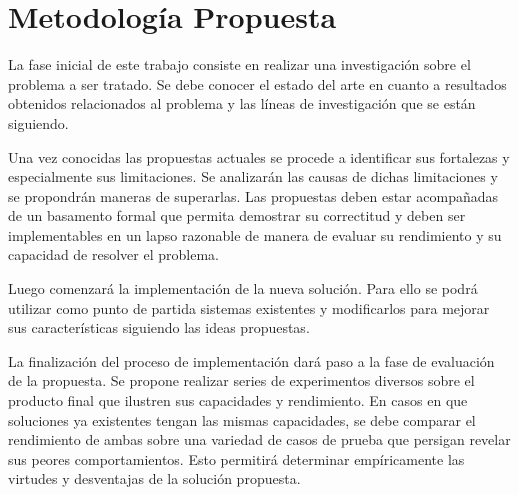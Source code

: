 \section{Metodología Propuesta}

La fase inicial de este trabajo consiste en realizar una investigación sobre el
problema a ser tratado. Se debe conocer el estado del arte en cuanto a resultados obtenidos
relacionados al problema y las líneas de investigación que se están siguiendo.

Una vez conocidas las propuestas actuales se procede a identificar sus
fortalezas y especialmente sus limitaciones. Se analizarán las causas de
dichas limitaciones y se propondrán maneras de superarlas. Las propuestas deben
estar acompañadas de un basamento formal que permita demostrar su correctitud y
deben ser implementables en un lapso razonable de manera de evaluar su
rendimiento y su capacidad de resolver el problema.

Luego comenzará la implementación de la nueva solución. Para ello se podrá
utilizar como punto de partida sistemas existentes y modificarlos para mejorar
sus características siguiendo las ideas propuestas.

La finalización del proceso de implementación dará paso a la fase de evaluación de
la propuesta. Se propone realizar series de experimentos diversos sobre el
producto final que ilustren sus capacidades y rendimiento. En casos en
que soluciones ya existentes tengan las mismas capacidades, se debe comparar el
rendimiento de ambas sobre una variedad de casos de prueba que persigan revelar
sus peores comportamientos. Esto permitirá determinar empíricamente las virtudes
y desventajas de la solución propuesta.
